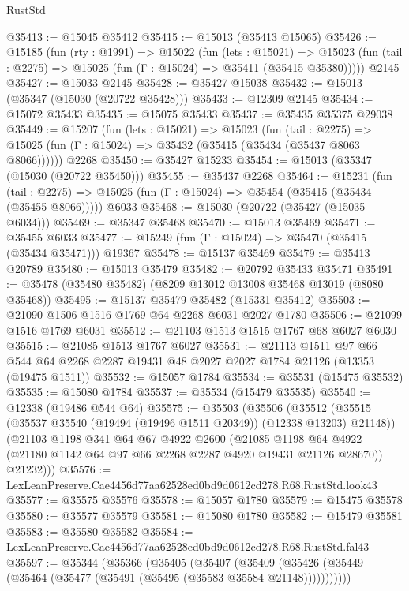 \begin{lexlean}{RustStd}
\begin{coremodule}
@35413 := @15045 @35412
@35415 := @15013 (@35413 @15065)
@35426 := @15185
    (fun (rty : @1991) =>
    @15022
      (fun (lets : @15021) =>
      @15023 (fun (tail : @2275) => @15025 (fun (Γ : @15024) => @35411 (@35415 @35380)))))
    @2145
@35427 := @15033 @2145
@35428 := @35427 @15038
@35432 := @15013 (@35347 (@15030 (@20722 @35428)))
@35433 := @12309 @2145
@35434 := @15072 @35433
@35435 := @15075 @35433
@35437 := @35435 @35375 @29038
@35449 := @15207
    (fun (lets : @15021) =>
    @15023
      (fun (tail : @2275) =>
      @15025 (fun (Γ : @15024) => @35432 (@35415 (@35434 (@35437 @8063 @8066))))))
    @2268
@35450 := @35427 @15233
@35454 := @15013 (@35347 (@15030 (@20722 @35450)))
@35455 := @35437 @2268
@35464 := @15231
    (fun (tail : @2275) => @15025 (fun (Γ : @15024) => @35454 (@35415 (@35434 (@35455 @8066)))))
    @6033
@35468 := @15030 (@20722 (@35427 (@15035 @6034)))
@35469 := @35347 @35468
@35470 := @15013 @35469
@35471 := @35455 @6033
@35477 := @15249 (fun (Γ : @15024) => @35470 (@35415 (@35434 @35471))) @19367
@35478 := @15137 @35469
@35479 := @35413 @20789
@35480 := @15013 @35479
@35482 := @20792 @35433 @35471
@35491 := @35478 (@35480 @35482) (@8209 @13012 @13008 @35468 @13019 (@8080 @35468))
@35495 := @15137 @35479 @35482 (@15331 @35412)
@35503 := @21090 @1506 @1516 @1769 @64 @2268 @6031 @2027 @1780
@35506 := @21099 @1516 @1769 @6031
@35512 := @21103 @1513 @1515 @1767 @68 @6027 @6030
@35515 := @21085 @1513 @1767 @6027
@35531 := @21113
    @1511
    @97
    @66
    @544
    @64
    @2268
    @2287
    @19431
    @48
    @2027
    @2027
    @1784
    @21126
    (@13353 (@19475 @1511))
@35532 := @15057 @1784
@35534 := @35531 (@15475 @35532)
@35535 := @15080 @1784
@35537 := @35534 (@15479 @35535)
@35540 := @12338 (@19486 @544 @64)
@35575 := @35503
    (@35506
      (@35512
        (@35515 (@35537 @35540 (@19494 (@19496 @1511 @20349)) (@12338 @13203) @21148))
        (@21103
          @1198
          @341
          @64
          @67
          @4922
          @2600
          (@21085 @1198 @64 @4922 (@21180 @1142 @64 @97 @66 @2268 @2287 @4920 @19431 @21126 @28670))
          @21232)))
@35576 := LexLeanPreserve.Cae4456d77aa62528ed0bd9d0612cd278.R68.RustStd.look43
@35577 := @35575 @35576
@35578 := @15057 @1780
@35579 := @15475 @35578
@35580 := @35577 @35579
@35581 := @15080 @1780
@35582 := @15479 @35581
@35583 := @35580 @35582
@35584 := LexLeanPreserve.Cae4456d77aa62528ed0bd9d0612cd278.R68.RustStd.fal43
@35597 := @35344
    (@35366
      (@35405
        (@35407
          (@35409 (@35426 (@35449 (@35464 (@35477 (@35491 (@35495 (@35583 @35584 @21148)))))))))))

\end{coremodule}
\end{lexlean}
